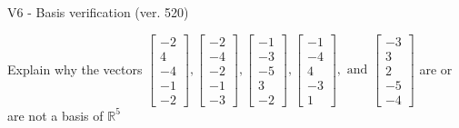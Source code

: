 \begin{exercise}
  \begin{exerciseTitle}V6 - Basis verification (ver. 520)\end{exerciseTitle}
  \begin{exerciseStatement}
    Explain why the vectors \(\left[\begin{array}{r}
-2 \\
4 \\
-4 \\
-1 \\
-2
\end{array}\right] , \left[\begin{array}{r}
-2 \\
-4 \\
-2 \\
-1 \\
-3
\end{array}\right] , \left[\begin{array}{r}
-1 \\
-3 \\
-5 \\
3 \\
-2
\end{array}\right] , \left[\begin{array}{r}
-1 \\
-4 \\
4 \\
-3 \\
1
\end{array}\right] , \text{ and } \left[\begin{array}{r}
-3 \\
3 \\
2 \\
-5 \\
-4
\end{array}\right]\) are or are not a basis of \(\mathbb{R}^5\)	



\end{exerciseStatement}
\end{exercise}
